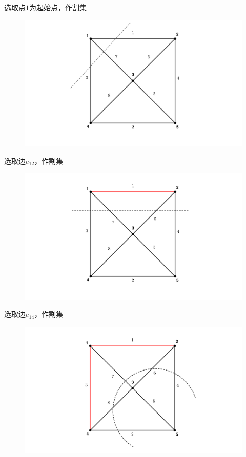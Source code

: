 \documentclass[lang = cn, scheme = chinese, thmcnt = section]{elegantbook}
\begin{document}
\begin{solution}
	选取点$1$为起始点，作割集
	\begin{figure}[H]
		\centering
		\includegraphics[scale = 0.15]{../图/12.2.1}
	\end{figure}
	
	选取边$e_{12}$，作割集
	\begin{figure}[H]
		\centering
		\includegraphics[scale = 0.15]{../图/12.2.2}
	\end{figure}
	
	选取边$e_{14}$，作割集
	\begin{figure}[H]
		\centering
		\includegraphics[scale = 0.15]{../图/12.2.3}
	\end{figure}
	

\end{solution}
\end{document}
